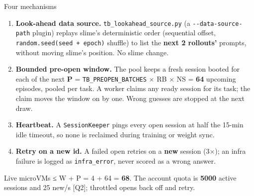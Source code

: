 \documentclass[
  10pt,
  ignorenonframetext,
  aspectratio=169,
  t]{beamer}
\providecommand{\tightlist}{%
  \setlength{\itemsep}{0pt}\setlength{\parskip}{0pt}}
\begin{document}
\begin{frame}[fragile]{Four mechanisms}
\protect\hypertarget{four-mechanisms}{}
\begin{enumerate}
\tightlist
\item
  \textbf{Look-ahead data source.} \texttt{tb\_lookahead\_source.py} (a
  \texttt{-\/-data-source-path} plugin) replays slime's deterministic
  order (sequential offset, \texttt{random.seed(seed\ +\ epoch)}
  shuffle) to list the \textbf{next 2 rollouts'} prompts, without moving
  slime's position. No slime change.
\item
  \textbf{Bounded pre-open window.} The pool keeps a fresh session
  booted for each of the next \textbf{P} = \texttt{TB\_PREOPEN\_BATCHES}
  × RB × NS = \textbf{64} upcoming episodes, pooled per task. A worker
  claims any ready session for its task; the claim moves the window on
  by one. Wrong guesses are stopped at the next draw.
\item
  \textbf{Heartbeat.} A \texttt{SessionKeeper} pings every open session
  at half the 15-min idle timeout, so none is reclaimed during training
  or weight sync.
\item
  \textbf{Retry on a new id.} A failed open retries on a \textbf{new}
  session (3×); an infra failure is logged as \texttt{infra\_error},
  never scored as a wrong answer.
\end{enumerate}

Live microVMs ≤ W + P = 4 + 64 = \textbf{68}. The account quota is
\textbf{5000} active sessions and 25 new/s {[}Q2{]}; throttled opens
back off and retry.
\end{frame}
\end{document}
